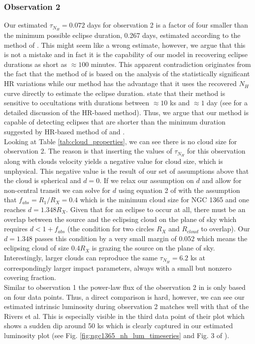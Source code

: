 \documentclass{aa}
\begin{document}
\subsubsection*{Observation 2}
Our estimated $\tau_{N_H} = 0.072$ days for observation 2 is a factor of four smaller than the minimum possible eclipse duration, 0.267 days, estimated according to the method of \citet{Pietrini2024}. This might seem like a wrong estimate, however, we argue that this is not a mistake and in fact it is the capability of our model in recovering eclipse durations as short as $\approx 100 $ minutes. This apparent contradiction originates from the fact that the method of \citet{Pietrini2024} is based on the analysis of the statistically significant HR variations while our method has the advantage that it uses the recovered $N_H$ curve directly to estimate the eclipse duration. \citet{Pietrini2024} state that their method is sensitive to occultations with durations between $\approx 10$ ks and $\approx 1$ day (see \citet{Torricelli2014} for a detailed discussion of the HR-based method). Thus, we argue that our method is capable of detecting eclipses that are shorter than the minimum duration suggested by HR-based method of \citet{Pietrini2024} and \citet{Torricelli2014}. \\
Looking at Table \ref{tab:cloud_properties}, we can see there is no cloud size for observation 2. The reason is that inserting the values of $\tau_{N_H}$ for this observation along with clouds velocity yields a negative value for cloud size, which is unphysical. This negative value is the result of our set of assumptions above that the cloud is spherical and $d = 0$. If we relax our assumption on $d$ and allow for non-central transit we can solve for $d$ using equation 2 of \citet{Pietrini2024} with the assumption that $f_{abs} = R_1/R_X = 0.4$ which is the minimum cloud size for NGC 1365 and one reaches $d = 1.348 R_X$. Given that for an eclipse to occur at all, there must be an overlap between the source and the eclipsing cloud on the plane of sky which requires $d < 1 + f_{abs}$ (the condition for two circles $R_X$ and $R_{cloud}$ to overlap). Our $d = 1.348$ passes this condition by a very small margin of $0.052$ which means the eclipsing cloud of size $0.4R_X$ is grazing the source on the plane of sky. Interestingly, larger clouds can reproduce the same $\tau_{N_H} = 6.2$ ks at correspondingly larger impact parameters, always with a small but nonzero covering fraction. \\
Similar to observation 1 the power-law flux of the observation 2 in \citet{Rivers2015} is only based on four data points. Thus, a direct comparison is hard, however, we can see our estimated intrinsic luminosity during observation 2 matches well with that of the Rivers et al. This is especially visible in the third data point of their plot which shows a sudden dip around 50 ks which is clearly captured in our estimated luminosity plot (see Fig. \ref{fig:ngc1365_nh_lum_timeseries} and Fig. 3 of \citealt{Rivers2015}). \\
\end{document}
